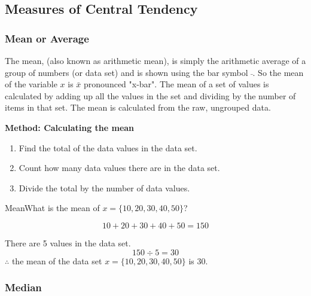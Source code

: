 \documentclass[10pt,a4paper,titlepage,twoside,openright]{report}
\begin{document}
\subsection{Measures of Central Tendency}


\subsubsection{Mean or Average}
The mean, (also known as arithmetic mean), is simply the arithmetic average of a group of numbers (or data set) and is shown using the bar symbol $\bar {}$. So the mean of the variable $x$ is $\bar{x}$ pronounced "x-bar". The mean of a set of values is calculated by adding up all the values in the set and dividing by the number of items in that set. The mean is calculated from the raw, ungrouped data.


\textbf{Method: Calculating the mean}
\begin{enumerate}
\item Find the total of the data values in the data set.
\item Count how many data values there are in the data set.
\item Divide the total by the number of data values.
\end{enumerate}

\begin{wex}{Mean}{What is the mean of $x=\{10,20,30,40,50\}$?}
{
\begin{equation*}
10+20+30+40+50=150
\end{equation*}

There are 5 values in the data set.
\begin{equation*}
150 \div 5 = 30
\end{equation*}
$\therefore$ the mean of the data set $x=\{10,20,30,40,50\}$ is 30.}
\end{wex}

\subsubsection{Median}
\end{document}
